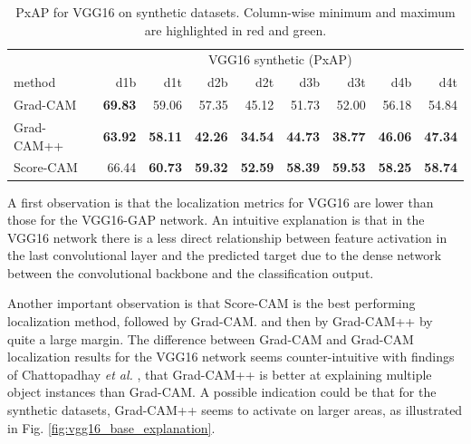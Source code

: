 \begin{table}[ht]
\centering
\begin{tabular}{lrrrrrrrr}
\toprule
 & \multicolumn{8}{c}{VGG16 synthetic (PxAP)} \\
method & d1b & d1t & d2b & d2t & d3b & d3t & d4b & d4t \\
\cmidrule(lr){1-1} \cmidrule(lr){2-9}
Grad-CAM & \color{teal} \bfseries 69.83 & 59.06 & 57.35 & 45.12 & 51.73 & 52.00 & 56.18 & 54.84 \\
Grad-CAM++ & \color{purple} \bfseries 63.92 & \color{purple} \bfseries 58.11 & \color{purple} \bfseries 42.26 & \color{purple} \bfseries 34.54 & \color{purple} \bfseries 44.73 & \color{purple} \bfseries 38.77 & \color{purple} \bfseries 46.06 & \color{purple} \bfseries 47.34 \\
Score-CAM & 66.44 & \color{teal} \bfseries 60.73 & \color{teal} \bfseries 59.32 & \color{teal} \bfseries 52.59 & \color{teal} \bfseries 58.39 & \color{teal} \bfseries 59.53 & \color{teal} \bfseries 58.25 & \color{teal} \bfseries 58.74 \\
\bottomrule
\end{tabular}
\caption[PxAP for VGG16 on synthetic datasets]{PxAP for VGG16 on synthetic datasets. Column-wise minimum and maximum are highlighted in red and green.}
\label{tab:pxap_vgg16_base_synthetic}
\end{table}

A first observation is that the localization metrics for VGG16 are lower than those for the VGG16-GAP network. An intuitive explanation is that in the VGG16 network there is a less direct relationship between feature activation in the last convolutional layer and the predicted target due to the dense network between the convolutional backbone and the classification output. 

Another important observation is that Score-CAM is the best performing localization method, followed by Grad-CAM. and then by Grad-CAM++ by quite a large margin. The difference between Grad-CAM and Grad-CAM localization results for the VGG16 network seems counter-intuitive with findings of Chattopadhay \textit{et al.} \cite{chattopadhay2018grad}, that Grad-CAM++ is better at explaining multiple object instances than Grad-CAM. A possible indication could be that for the synthetic datasets, Grad-CAM++ seems to activate on larger areas, as illustrated in Fig. \ref{fig:vgg16_base_explanation}.

